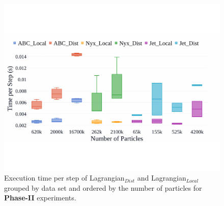\begin{figure}[h]
\centering
\includegraphics[width=\linewidth, trim={0.45cm 3.5cm 2cm 4.5cm}, clip]{Images/dataset_timings4.pdf}
\caption{Execution time per step of Lagrangian$_{Dist}$ and Lagrangian$_{Local}$ grouped by data set and ordered by the number of particles for \textbf{Phase-II} experiments.}
\label{fig:dataset_timings}
\end{figure}

